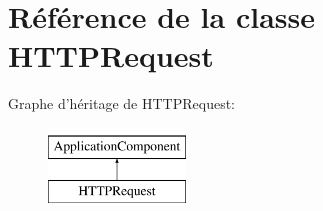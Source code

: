 \hypertarget{class_library_1_1_h_t_t_p_request}{\section{Référence de la classe H\+T\+T\+P\+Request}
\label{class_library_1_1_h_t_t_p_request}
}
Graphe d'héritage de H\+T\+T\+P\+Request\+:\begin{figure}[H]
\begin{center}
\leavevmode
\includegraphics[height=2.000000cm]{class_library_1_1_h_t_t_p_request}
\end{center}
\end{figure}

